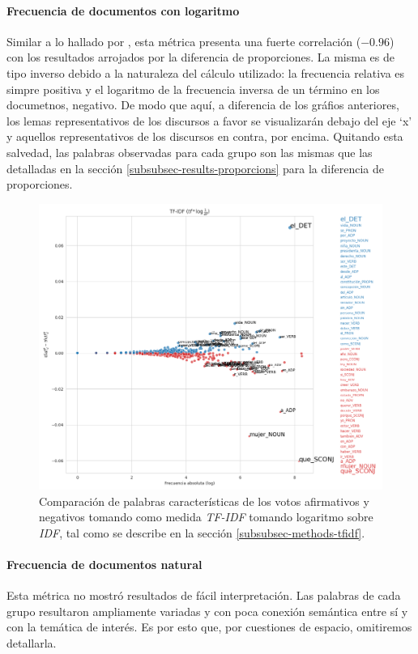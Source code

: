 \paragraph{Frecuencia de documentos con logaritmo}
Similar a lo hallado por \cite{monroe2008fightin}, esta m\'etrica presenta una
fuerte correlaci\'on ($-0.96$) con los resultados arrojados por la diferencia
de proporciones. La misma es de tipo inverso debido a la naturaleza del c\'alculo
utilizado: la frecuencia relativa es simpre positiva y el logaritmo de la
frecuencia inversa de un t\'ermino en los documetnos, negativo. De modo que aqu\'i,
a diferencia de los gr\'afios anteriores, los lemas representativos de los discursos
a favor se visualizar\'an debajo del eje `x' y aquellos representativos de los
discursos en contra, por encima. Quitando esta salvedad, las palabras observadas
para cada grupo son las mismas que las detalladas en la secci\'on
\ref{subsubsec-results-proporcions} para la diferencia de proporciones.

\begin{figure}[h!]
    \centering
    \includegraphics[scale=0.4]{./images/graphs/tfidf_dflogged.png}
    \caption{Comparaci\'on de palabras caracter\'isticas de los votos afirmativos y
    negativos tomando como medida \textit{TF-IDF} tomando logaritmo
    sobre \textit{IDF}, tal como se describe en la secci\'on
    \ref{subsubsec-methods-tfidf}.}
    \label{fig-statistics-wordscores}
\end{figure}


\paragraph{Frecuencia de documentos natural}
Esta m\'etrica no mostr\'o resultados de f\'acil interpretaci\'on. Las palabras de cada
grupo resultaron ampliamente variadas y con poca conexi\'on sem\'antica
entre s\'i y con la tem\'atica de inter\'es. Es por esto que, por cuestiones de espacio,
omitiremos detallarla.

